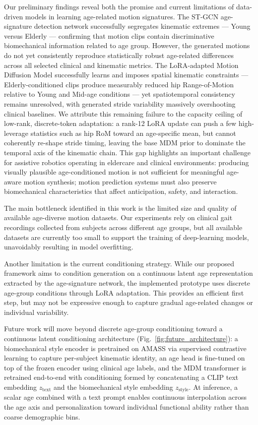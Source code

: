 Our preliminary findings reveal both the promise and current limitations of data-driven models in learning age-related motion signatures.
The ST-GCN age-signature detection network successfully segregates kinematic extremes --- Young versus Elderly --- confirming that motion clips contain discriminative biomechanical information related to age group.
However, the generated motions do not yet consistently reproduce statistically robust age-related differences across all selected clinical and kinematic metrics.
The LoRA-adapted Motion Diffusion Model successfully learns and imposes spatial kinematic constraints --- Elderly-conditioned clips produce measurably reduced hip Range-of-Motion relative to Young and Mid-age conditions --- yet spatiotemporal consistency remains unresolved, with generated stride variability massively overshooting clinical baselines.
We attribute this remaining failure to the capacity ceiling of low-rank, discrete-token adaptation: a rank-12 LoRA update can push a few high-leverage statistics such as hip RoM toward an age-specific mean, but cannot coherently re-shape stride timing, leaving the base MDM prior to dominate the temporal axis of the kinematic chain.
This gap highlights an important challenge for assistive robotics operating in eldercare and clinical environments: producing visually plausible age-conditioned motion is not sufficient for meaningful age-aware motion synthesis; motion prediction systems must also preserve biomechanical characteristics that affect anticipation, safety, and interaction.

The main bottleneck identified in this work is the limited size and quality of available age-diverse motion datasets.
Our experiments rely on clinical gait recordings collected from subjects across different age groups, but all available datasets are currently too small to support the training of deep-learning models, unavoidably resulting in model overfitting.

Another limitation is the current conditioning strategy.
While our proposed framework aims to condition generation on a continuous latent age representation extracted by the age-signature network, the implemented prototype uses discrete age-group conditions through LoRA adaptation.
This provides an efficient first step, but may not be expressive enough to capture gradual age-related changes or individual variability.

Future work will move beyond discrete age-group conditioning toward a continuous latent conditioning architecture (Fig.~\ref{fig:future_architecture}): a biomechanical style encoder is pretrained on AMASS via supervised contrastive learning to capture per-subject kinematic identity, an age head is fine-tuned on top of the frozen encoder using clinical age labels, and the MDM transformer is retrained end-to-end with conditioning formed by concatenating a CLIP text embedding $z_\text{text}$ and the biomechanical style embedding $z_\text{style}$.
At inference, a scalar age combined with a text prompt enables continuous interpolation across the age axis and personalization toward individual functional ability rather than coarse demographic bins.
